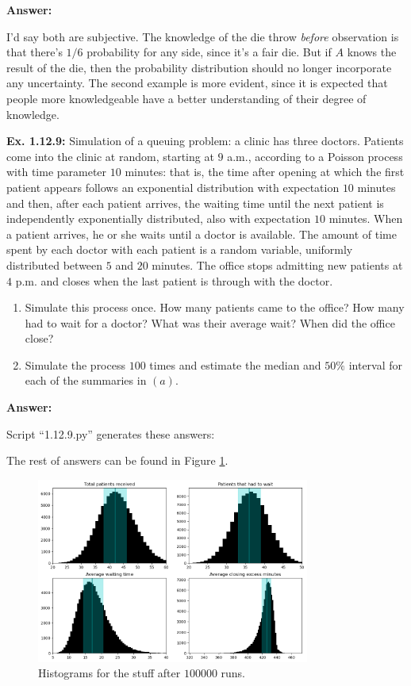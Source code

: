 \documentclass{article}
\begin{document}
\textbf{Answer:}

I'd say both are subjective. The knowledge of the die throw \textit{before} observation is that there's $1/6$ probability for any side, since it's a fair die. But if $A$ knows the result of the die, then the probability distribution should no longer incorporate any uncertainty. The second example is more evident, since it is expected that people more knowledgeable have a better understanding of their degree of knowledge.

\textbf{Ex. 1.12.9: }Simulation of a queuing problem: a clinic has three doctors. Patients come into the clinic at random, starting at $9$ a.m., according to a Poisson process with time parameter $10$ minutes: that is, the time after opening at which the first patient appears follows an exponential distribution with expectation $10$ minutes and then, after each patient arrives, the waiting time until the next patient is independently exponentially distributed, also with expectation $10$ minutes. When a patient arrives, he or she waits until a doctor is available. The amount of time spent by each doctor with each patient is a random variable, uniformly distributed between $5$ and $20$ minutes. The office stops admitting new patients at $4$ p.m. and closes when the last patient is through with the doctor.
\begin{enumerate}[label=\alph*]
	\item Simulate this process once. How many patients came to the office? How many had to wait for a doctor? What was their average wait? When did the office close?
	\item Simulate the process $100$ times and estimate the median and $50\%$ interval for each of the summaries in $(a)$.
\end{enumerate}

\textbf{Answer:}

Script ``1.12.9.py'' generates these answers:


The rest of answers can be found in Figure \ref{fig:1.12.9}.
\begin{figure}[h]
	\centering
	\includegraphics[width=0.8\textwidth]{Numerical/1.12.9}
	\caption{Histograms for the stuff after $100000$ runs.}
	\label{fig:1.12.9}
\end{figure}
\end{document}
